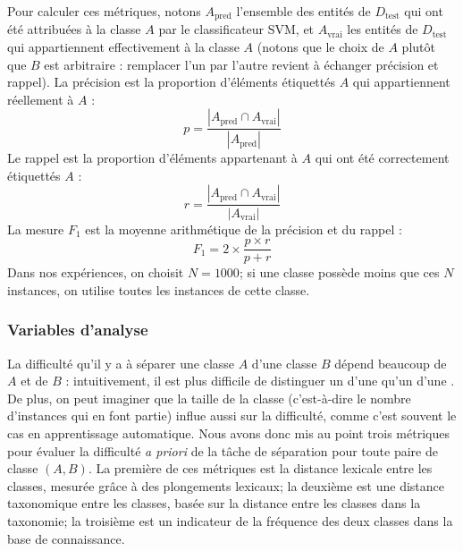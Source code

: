 Pour calculer ces métriques, notons $A_\textrm{pred}$ l'ensemble des entités de $D_\textrm{test}$ qui ont été attribuées à la classe $A$ par le classificateur SVM, et $A_\textrm{vrai}$ les entités de $D_\textrm{test}$ qui appartiennent effectivement à la classe $A$ (notons que le choix de $A$ plutôt que $B$ est arbitraire : remplacer l'un par l'autre revient à échanger précision et rappel).
La précision est la proportion d'éléments étiquettés $A$ qui appartiennent réellement à $A$ :
\begin{equation*}
    p = \frac{|A_\textrm{pred} \cap A_\textrm{vrai}|}{|A_\textrm{pred}|}
\end{equation*}
Le rappel est la proportion d'éléments appartenant à $A$ qui ont été correctement étiquettés $A$ :
\begin{equation*}
    r = \frac{|A_\textrm{pred} \cap A_\textrm{vrai}|}{|A_\textrm{vrai}|}
\end{equation*}
La mesure $F_1$ est la moyenne arithmétique de la précision et du rappel :
\begin{equation*}
    F_1 = 2 \times \frac{p \times r}{p + r}
\end{equation*}
Dans nos expériences, on choisit $N=1000$; si une classe possède moins que ces $N$ instances, on utilise toutes les instances de cette classe.



\subsubsection{Variables d'analyse}

La difficulté qu'il y a à séparer une classe $A$ d'une classe $B$ dépend beaucoup de $A$ et de $B$ : intuitivement, il est plus difficile de distinguer un  d'une  qu'un  d'une . De plus, on peut imaginer que la taille de la classe (c'est-à-dire le nombre d'instances qui en font partie) influe aussi sur la difficulté, comme c'est souvent le cas en apprentissage automatique. Nous avons donc mis au point trois métriques pour évaluer la difficulté \textit{a priori} de la tâche de séparation pour toute paire de classe $(A, B)$. La première de ces métriques est la distance lexicale entre les classes, mesurée grâce à des plongements lexicaux; la deuxième est une distance taxonomique entre les classes, basée sur la distance entre les classes dans la taxonomie; la troisième est un indicateur de la fréquence des deux classes dans la base de connaissance.


